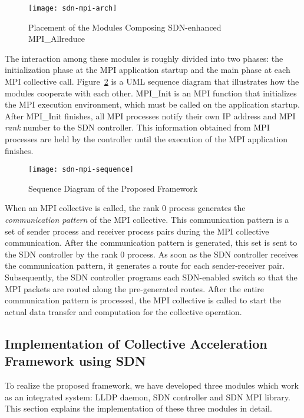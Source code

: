 \begin{figure}
    \centering
    \texttt{[image: sdn-mpi-arch]}
    \caption{Placement of the Modules Composing SDN-enhanced MPI\_Allreduce}%
    \label{fig:proposal-placement}
\end{figure}

The interaction among these modules is roughly divided into two phases: the
initialization phase at the MPI application startup and the main phase at each
MPI collective call. Figure~\ref{fig:proposal-sequence} is a UML sequence
diagram that illustrates how the modules cooperate with each other. MPI\_Init
is an MPI function that initializes the MPI execution environment, which must
be called on the application startup. After MPI\_Init finishes, all MPI
processes notify their own IP address and MPI \emph{rank} number to the SDN
controller. This information obtained from MPI processes are held by the
controller until the execution of the MPI application finishes.

\begin{figure}
    \centering
    \texttt{[image: sdn-mpi-sequence]}
    \caption{Sequence Diagram of the Proposed Framework}%
    \label{fig:proposal-sequence}
\end{figure}

When an MPI collective is called, the rank 0 process generates the
\emph{communication pattern} of the MPI collective. This communication pattern is
a set of sender process and receiver process pairs during the MPI collective
communication. After the communication pattern is generated, this set is sent
to the SDN controller by the rank 0 process. As soon as the SDN controller
receives the communication pattern, it generates a route for each
sender-receiver pair. Subsequently, the SDN controller programs each
SDN-enabled switch so that the MPI packets are routed along the pre-generated
routes. After the entire communication pattern is processed, the MPI
collective is called to start the actual data transfer and computation for the
collective operation.

\subsection{Implementation of Collective Acceleration Framework using SDN}

To realize the proposed framework, we have developed three modules which
work as an integrated system: LLDP daemon, SDN controller and SDN MPI library.
This section explains the implementation of these three modules in detail.

